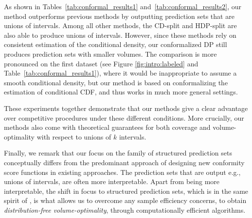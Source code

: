 As shown in Tables~\ref{tab:conformal_results1} and~\ref{tab:conformal_results2}, our method  outperforms previous methods by outputting prediction sets that are unions of intervals. Among all other methods, the CD-split and HDP-split \citep{izbicki2020flexible} are also able to produce unions of intervals. However, since these methods rely on consistent estimation of the conditional density, our conformalized DP still produces prediction sets with smaller volumes. The comparison is more pronounced on the first dataset (see Figure \ref{fig:intro:labeled} and Table~\ref{tab:conformal_results1}), where it would be inappropriate to assume a smooth conditional density, but our method is based on conformalizing the estimation of conditional CDF, and thus works in much more general settings.















These experiments together demonstrate that our methods give a clear advantage over competitive procedures under these different conditions. More crucially, our methods also come with theoretical guarantees for both coverage and volume-optimality with respect to unions of $k$ intervals. 

Finally, we remark that our focus on the family of structured prediction sets conceptually differs from the predominant approach of designing new conformity score functions in existing approaches. 
The prediction sets that are output e.g., unions of intervals, are often more interpretable.
Apart from being more interpretable, the shift in focus to structured prediction sets, which is in the same spirit of \cite{gupta2022nested}, is what allows us to overcome any sample efficiency concerns, to obtain {\em distribution-free volume-optimality}, through {computationally efficient algorithms}. 

